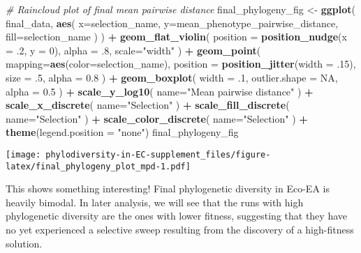 \documentclass[]{book}
\newenvironment{Shaded}{\begin{snugshade}}{\end{snugshade}}
\newcommand{\CommentTok}[1]{\textcolor[rgb]{0.56,0.35,0.01}{\textit{#1}}}
\newcommand{\DataTypeTok}[1]{\textcolor[rgb]{0.13,0.29,0.53}{#1}}
\newcommand{\DecValTok}[1]{\textcolor[rgb]{0.00,0.00,0.81}{#1}}
\newcommand{\FloatTok}[1]{\textcolor[rgb]{0.00,0.00,0.81}{#1}}
\newcommand{\KeywordTok}[1]{\textcolor[rgb]{0.13,0.29,0.53}{\textbf{#1}}}
\newcommand{\NormalTok}[1]{#1}
\newcommand{\OperatorTok}[1]{\textcolor[rgb]{0.81,0.36,0.00}{\textbf{#1}}}
\newcommand{\OtherTok}[1]{\textcolor[rgb]{0.56,0.35,0.01}{#1}}
\newcommand{\StringTok}[1]{\textcolor[rgb]{0.31,0.60,0.02}{#1}}
\begin{document}
\begin{Shaded}
\begin{Highlighting}[]
\CommentTok{# Raincloud plot of final mean pairwise distance}
\NormalTok{final_phylogeny_fig <-}\StringTok{ }\KeywordTok{ggplot}\NormalTok{(}
\NormalTok{    final_data,}
    \KeywordTok{aes}\NormalTok{(}
      \DataTypeTok{x=}\NormalTok{selection_name,}
      \DataTypeTok{y=}\NormalTok{mean_phenotype_pairwise_distance,}
      \DataTypeTok{fill=}\NormalTok{selection_name}
\NormalTok{    )}
\NormalTok{  ) }\OperatorTok{+}
\StringTok{  }\KeywordTok{geom_flat_violin}\NormalTok{(}
    \DataTypeTok{position =} \KeywordTok{position_nudge}\NormalTok{(}\DataTypeTok{x =} \FloatTok{.2}\NormalTok{, }\DataTypeTok{y =} \DecValTok{0}\NormalTok{),}
    \DataTypeTok{alpha =} \FloatTok{.8}\NormalTok{,}
    \DataTypeTok{scale=}\StringTok{"width"}
\NormalTok{  ) }\OperatorTok{+}
\StringTok{  }\KeywordTok{geom_point}\NormalTok{(}
    \DataTypeTok{mapping=}\KeywordTok{aes}\NormalTok{(}\DataTypeTok{color=}\NormalTok{selection_name),}
    \DataTypeTok{position =} \KeywordTok{position_jitter}\NormalTok{(}\DataTypeTok{width =} \FloatTok{.15}\NormalTok{),}
    \DataTypeTok{size =} \FloatTok{.5}\NormalTok{,}
    \DataTypeTok{alpha =} \FloatTok{0.8}
\NormalTok{  ) }\OperatorTok{+}
\StringTok{  }\KeywordTok{geom_boxplot}\NormalTok{(}
    \DataTypeTok{width =} \FloatTok{.1}\NormalTok{,}
    \DataTypeTok{outlier.shape =} \OtherTok{NA}\NormalTok{,}
    \DataTypeTok{alpha =} \FloatTok{0.5}
\NormalTok{  ) }\OperatorTok{+}
\StringTok{  }\KeywordTok{scale_y_log10}\NormalTok{(}
    \DataTypeTok{name=}\StringTok{"Mean pairwise distance"}
\NormalTok{  ) }\OperatorTok{+}
\StringTok{  }\KeywordTok{scale_x_discrete}\NormalTok{(}
    \DataTypeTok{name=}\StringTok{"Selection"}
\NormalTok{  ) }\OperatorTok{+}
\StringTok{  }\KeywordTok{scale_fill_discrete}\NormalTok{(}
    \DataTypeTok{name=}\StringTok{"Selection"}
\NormalTok{  ) }\OperatorTok{+}
\StringTok{  }\KeywordTok{scale_color_discrete}\NormalTok{(}
    \DataTypeTok{name=}\StringTok{"Selection"}
\NormalTok{  ) }\OperatorTok{+}\StringTok{ }
\StringTok{  }\KeywordTok{theme}\NormalTok{(}\DataTypeTok{legend.position =} \StringTok{"none"}\NormalTok{)}
\NormalTok{final_phylogeny_fig}
\end{Highlighting}
\end{Shaded}

\texttt{[image: phylodiversity-in-EC-supplement\_files/figure-latex/final\_phylogeny\_plot\_mpd-1.pdf]}

This shows something interesting! Final phylogenetic diversity in Eco-EA is heavily bimodal. In later analysis, we will see that the runs with high phylogenetic diversity are the ones with lower fitness, suggesting that they have no yet experienced a selective sweep resulting from the discovery of a high-fitness solution.
\end{document}
